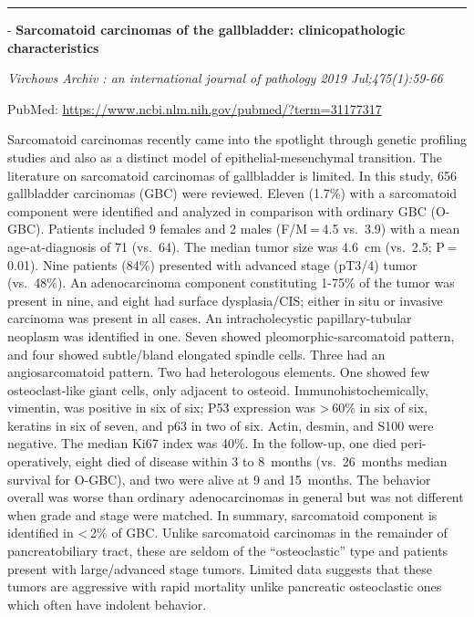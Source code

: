 \documentclass[]{article}
\begin{document}
{}

{}

\begin{center}\rule{0.5\linewidth}{\linethickness}\end{center}

 - \textbf{Sarcomatoid carcinomas of the gallbladder: clinicopathologic
characteristics}

\emph{Virchows Archiv : an international journal of pathology 2019
Jul;475(1):59-66}

PubMed: \url{https://www.ncbi.nlm.nih.gov/pubmed/?term=31177317}

Sarcomatoid carcinomas recently came into the spotlight through genetic
profiling studies and also as a distinct model of epithelial-mesenchymal
transition. The literature on sarcomatoid carcinomas of gallbladder is
limited. In this study, 656 gallbladder carcinomas (GBC) were reviewed.
Eleven (1.7\%) with a sarcomatoid component were identified and analyzed
in comparison with ordinary GBC (O-GBC). Patients included 9 females and
2 males (F/M = 4.5 vs.~3.9) with a mean age-at-diagnosis of 71 (vs.~64).
The median tumor size was 4.6~cm (vs.~2.5; P = 0.01). Nine patients
(84\%) presented with advanced stage (pT3/4) tumor (vs.~48\%). An
adenocarcinoma component constituting 1-75\% of the tumor was present in
nine, and eight had surface dysplasia/CIS; either in situ or invasive
carcinoma was present in all cases. An intracholecystic
papillary-tubular neoplasm was identified in one. Seven showed
pleomorphic-sarcomatoid pattern, and four showed subtle/bland elongated
spindle cells. Three had an angiosarcomatoid pattern. Two had
heterologous elements. One showed few osteoclast-like giant cells, only
adjacent to osteoid. Immunohistochemically, vimentin, was positive in
six of six; P53 expression was \textgreater{} 60\% in six of six,
keratins in six of seven, and p63 in two of six. Actin, desmin, and S100
were negative. The median Ki67 index was 40\%. In the follow-up, one
died peri-operatively, eight died of disease within 3 to 8~months
(vs.~26~months median survival for O-GBC), and two were alive at 9 and
15~months. The behavior overall was worse than ordinary adenocarcinomas
in general but was not different when grade and stage were matched. In
summary, sarcomatoid component is identified in \textless{} 2\% of GBC.
Unlike sarcomatoid carcinomas in the remainder of pancreatobiliary
tract, these are seldom of the ``osteoclastic'' type and patients
present with large/advanced stage tumors. Limited data suggests that
these tumors are aggressive with rapid mortality unlike pancreatic
osteoclastic ones which often have indolent behavior.
\end{document}
